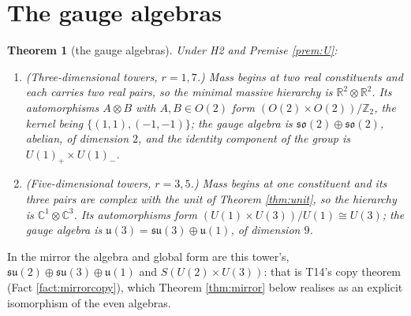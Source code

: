 \documentclass[11pt]{article}
\newtheorem{theorem}{Theorem}[section]
\theoremstyle{definition}
\newcommand{\R}{\mathbb{R}}
\newcommand{\C}{\mathbb{C}}
\newcommand{\su}{\mathfrak{su}}
\newcommand{\so}{\mathfrak{so}}
\newcommand{\uu}{\mathfrak{u}}
\begin{document}
\section{The gauge algebras}\label{sec:algebras}

\begin{theorem}[the gauge algebras]\label{thm:algebras}
Under H2 and Premise \ref{prem:U}:
\begin{enumerate}
\item[(i)] (Three-dimensional towers, $r = 1, 7$.) Mass begins at two real constituents and each carries two real pairs, so the minimal massive hierarchy is $\R^{2} \otimes \R^{2}$. Its automorphisms $A \otimes B$ with $A, B \in O(2)$ form $(O(2) \times O(2))/\mathbb{Z}_{2}$, the kernel being $\{(1,1), (-1,-1)\}$; the gauge algebra is $\so(2) \oplus \so(2)$, abelian, of dimension $2$, and the identity component of the group is $U(1)_{+} \times U(1)_{-}$.
\item[(ii)] (Five-dimensional towers, $r = 3, 5$.) Mass begins at one constituent and its three pairs are complex with the unit of Theorem \ref{thm:unit}, so the hierarchy is $\C^{1} \otimes \C^{3}$. Its automorphisms form $(U(1) \times U(3))/U(1) \cong U(3)$; the gauge algebra is $\uu(3) = \su(3) \oplus \uu(1)$, of dimension $9$.
\end{enumerate}
\end{theorem}

In the mirror the algebra and global form are this tower's, $\su(2) \oplus \su(3) \oplus \uu(1)$ and $S(U(2) \times U(3))$: that is T14's copy theorem (Fact \ref{fact:mirrorcopy}), which Theorem \ref{thm:mirror} below realises as an explicit isomorphism of the even algebras.
\end{document}
